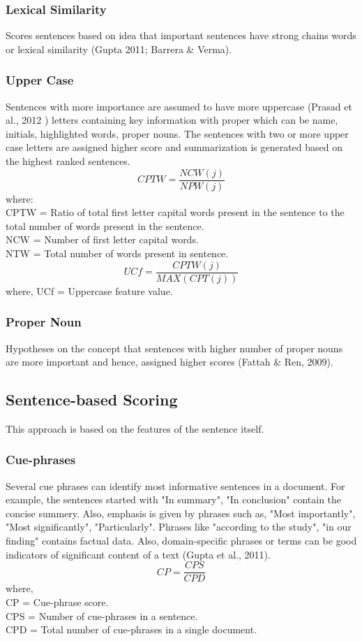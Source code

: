 \documentclass[conference]{IEEEtran}
\begin{document}
\subsubsection{Lexical Similarity}
Scores sentences based on idea that important sentences have strong chains words or lexical similarity (Gupta 2011; Barrera \& Verma).\\
\subsubsection{Upper Case}
Sentences with more importance are assumed to have more uppercase (Prasad et al., 2012 ) letters containing key information with proper which can be name, initials, highlighted words, proper nouns. The sentences with two or more upper case letters are assigned higher score and summarization is generated based on the highest ranked sentences.
$$CPTW =  \frac{NCW(j)}{NPW(j)}$$
where:\\
CPTW = Ratio of total first letter capital words present in the
sentence to the total number of words present in the sentence.\\
NCW = Number of first letter capital words.\\
NTW = Total number of words present in sentence.\\
$$UCf = \frac{CPTW(j)}{MAX(CPT(j))}$$
where, UCf = Uppercase feature value.\\
\subsubsection{Proper Noun}
Hypotheses on the concept that sentences with higher number of proper nouns are more important and hence, assigned higher scores (Fattah \& Ren, 2009).\\
\subsection{Sentence-based Scoring}
This approach is based on the features of the sentence itself.\\
\subsubsection{Cue-phrases}
Several cue phrases can identify most informative sentences in a document. For example, the sentences started with "In summary", "In conclusion" contain the concise summery. Also, emphasis is given by phrases such as, "Most importantly", "Most significantly", "Particularly". Phrases like "according to the study", "in our finding" contains factual data. Also, domain-specific phrases or terms can be good indicators of significant content of a text (Gupta et al., 2011).
$$
CP = \frac{CPS}{CPD}
$$
where,\\
CP = Cue-phrase score.\\
CPS = Number of cue-phrases in a sentence.\\
CPD = Total number of cue-phrases in a single document.\\
\end{document}
